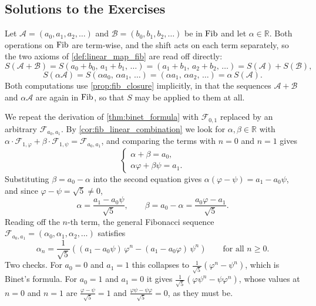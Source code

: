 \subsection{Solutions to the Exercises}
\label{sec:solutions_fibonacci}

\begin{exercisesolution}
\label{sol:shift_is_linear_b}
Let $\mathcal{A} = (a_0, a_1, a_2, \dots)$ and $\mathcal{B} = (b_0, b_1, b_2, \dots)$ be in $\operatorname{Fib}$ and let $\alpha \in \mathbb{R}$. Both operations on $\operatorname{Fib}$ are term-wise, and the shift acts on each term separately, so the two axioms of \cref{def:linear_map_fib} are read off directly:
\[
    S(\mathcal{A} + \mathcal{B}) = S(a_0 + b_0, \, a_1 + b_1, \, \dots) = (a_1 + b_1, \, a_2 + b_2, \, \dots) = S(\mathcal{A}) + S(\mathcal{B}),
\]
\[
    S(\alpha \mathcal{A}) = S(\alpha a_0, \, \alpha a_1, \, \dots) = (\alpha a_1, \, \alpha a_2, \, \dots) = \alpha \, S(\mathcal{A}).
\]
Both computations use \cref{prop:fib_closure} implicitly, in that the sequences $\mathcal{A} + \mathcal{B}$ and $\alpha \mathcal{A}$ are again in $\operatorname{Fib}$, so that $S$ may be applied to them at all.
\end{exercisesolution}

\begin{exercisesolution*}
\label{sol:ch1_list_a}
We repeat the derivation of \cref{thm:binet_formula} with $\mathcal{F}_{0,1}$ replaced by an arbitrary $\mathcal{F}_{a_0, a_1}$. By \cref{cor:fib_linear_combination} we look for $\alpha, \beta \in \mathbb{R}$ with $\alpha \cdot \mathcal{F}_{1,\varphi} + \beta \cdot \mathcal{F}_{1,\psi} = \mathcal{F}_{a_0, a_1}$, and comparing the terms with $n = 0$ and $n = 1$ gives
\[
\begin{cases}
    \alpha + \beta = a_0, \\
    \alpha \varphi + \beta \psi = a_1.
\end{cases}
\]
Substituting $\beta = a_0 - \alpha$ into the second equation gives $\alpha(\varphi - \psi) = a_1 - a_0 \psi$, and since $\varphi - \psi = \sqrt{5} \neq 0$,
\[
    \alpha = \frac{a_1 - a_0 \psi}{\sqrt{5}}, \qquad \beta = a_0 - \alpha = \frac{a_0 \varphi - a_1}{\sqrt{5}}.
\]
Reading off the $n$-th term, the general Fibonacci sequence $\mathcal{F}_{a_0, a_1} = (\alpha_0, \alpha_1, \alpha_2, \dots)$ satisfies
\[
    \alpha_n = \frac{1}{\sqrt{5}} \left( (a_1 - a_0 \psi) \, \varphi^n - (a_1 - a_0 \varphi) \, \psi^n \right) \qquad \text{for all } n \ge 0.
\]
Two checks. For $a_0 = 0$ and $a_1 = 1$ this collapses to $\frac{1}{\sqrt{5}}(\varphi^n - \psi^n)$, which is Binet's formula. For $a_0 = 1$ and $a_1 = 0$ it gives $\frac{1}{\sqrt{5}}(\varphi \psi^n - \psi \varphi^n)$, whose values at $n = 0$ and $n = 1$ are $\frac{\varphi - \psi}{\sqrt{5}} = 1$ and $\frac{\varphi\psi - \psi\varphi}{\sqrt{5}} = 0$, as they must be.
\end{exercisesolution*}

